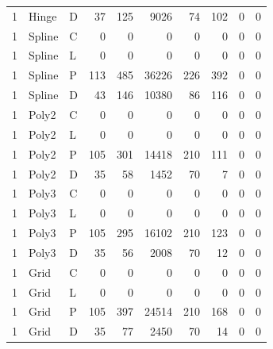 \begin{longtable}{lllrrrrrrr}
1 & Hinge & D & 37 & 125 & 9026 & 74 & 102 & 0 & 0 \\
1 & Spline & C & 0 & 0 & 0 & 0 & 0 & 0 & 0 \\
1 & Spline & L & 0 & 0 & 0 & 0 & 0 & 0 & 0 \\
1 & Spline & P & 113 & 485 & 36226 & 226 & 392 & 0 & 0 \\
1 & Spline & D & 43 & 146 & 10380 & 86 & 116 & 0 & 0 \\
1 & Poly2 & C & 0 & 0 & 0 & 0 & 0 & 0 & 0 \\
1 & Poly2 & L & 0 & 0 & 0 & 0 & 0 & 0 & 0 \\
1 & Poly2 & P & 105 & 301 & 14418 & 210 & 111 & 0 & 0 \\
1 & Poly2 & D & 35 & 58 & 1452 & 70 & 7 & 0 & 0 \\
1 & Poly3 & C & 0 & 0 & 0 & 0 & 0 & 0 & 0 \\
1 & Poly3 & L & 0 & 0 & 0 & 0 & 0 & 0 & 0 \\
1 & Poly3 & P & 105 & 295 & 16102 & 210 & 123 & 0 & 0 \\
1 & Poly3 & D & 35 & 56 & 2008 & 70 & 12 & 0 & 0 \\
1 & Grid & C & 0 & 0 & 0 & 0 & 0 & 0 & 0 \\
1 & Grid & L & 0 & 0 & 0 & 0 & 0 & 0 & 0 \\
1 & Grid & P & 105 & 397 & 24514 & 210 & 168 & 0 & 0 \\
1 & Grid & D & 35 & 77 & 2450 & 70 & 14 & 0 & 0 \\
\end{longtable}
\endgroup


